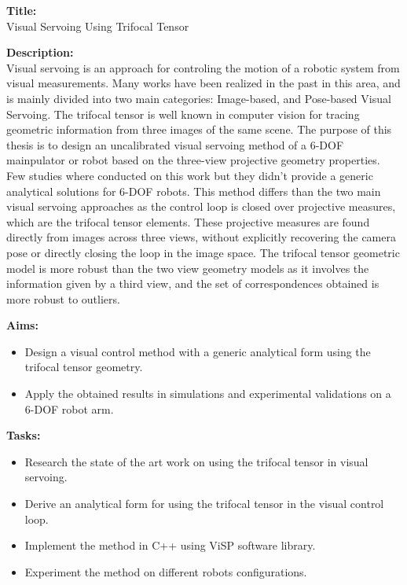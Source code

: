 \textbf{Title:}\\
Visual Servoing Using Trifocal Tensor

\textbf{Description:}\\
Visual servoing is an approach for controling the motion of a robotic system from visual measurements. Many works have been realized in the past in this area, and is mainly divided into two main categories: Image-based, and Pose-based Visual Servoing. The trifocal tensor is well known in computer vision for tracing geometric information from three images of the same scene. The purpose of this thesis is to design an uncalibrated visual servoing method of a 6-DOF mainpulator or robot based on the three-view projective geometry properties. Few studies where conducted on this work but they didn't provide a generic analytical solutions for 6-DOF robots. This method differs than the two main visual servoing approaches as the control loop is closed over projective measures, which are the trifocal tensor elements. These projective measures are found directly from images across three views, without explicitly recovering the camera pose or directly closing the loop in the image space. The trifocal tensor geometric model is more robust than the two view geometry models as it involves the information given by a third view, and the set of correspondences obtained is more robust to outliers.

\textbf{Aims:}\\
\begin{itemize}
  \item Design a visual control method with a generic analytical form using the trifocal tensor geometry.
  \item Apply the obtained results in simulations and experimental validations on a 6-DOF robot arm.
\end{itemize}

\textbf{Tasks:}\\
\begin{itemize}
\item Research the state of the art work on using the trifocal tensor in visual servoing.
\item Derive an analytical form for using the trifocal tensor in the visual control loop.
\item Implement the method in C++ using ViSP software library.
\item Experiment the method on different robots configurations.
\end{itemize}
